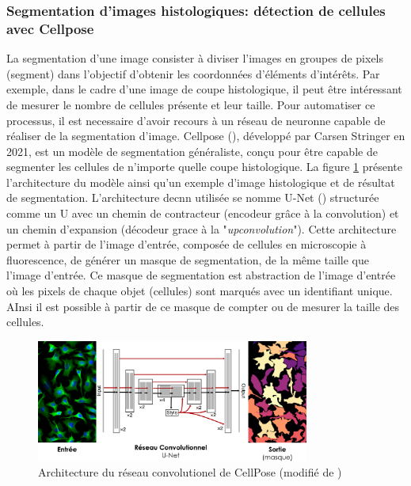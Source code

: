 \subsubsection{Segmentation d'images histologiques: détection de cellules avec Cellpose}
La segmentation d'une image consister à diviser l'images en groupes de pixels (segment) dans l'objectif d'obtenir les coordonnées d'éléments d'intérêts. Par exemple, dans le cadre d'une image de coupe histologique, il peut être intéressant de mesurer le nombre de cellules présente et leur taille. Pour automatiser ce processus, il est necessaire d'avoir recours à un réseau de neuronne capable de réaliser de la segmentation d'image.
Cellpose (\cite{stringer_cellpose_2021}), développé par Carsen Stringer en 2021, est un modèle de segmentation généraliste, conçu pour être capable de segmenter les cellules de n'importe quelle coupe histologique. La figure \ref{fig:cellpose_archi} présente l'architecture du modèle ainsi qu'un exemple d'image histologique et de résultat de segmentation. L'architecture de\gls{cnn} utilisée se nomme U-Net (\cite{ronneberger_u-net_2015}) structurée comme un U avec un chemin de contracteur (encodeur grâce à la convolution) et un chemin d'expansion (décodeur grace à la "\textit{upconvolution}"). Cette architecture permet à partir de l'image d'entrée, composée de cellules en microscopie à fluorescence, de générer un masque de segmentation, de la même taille que l'image d'entrée. Ce masque de segmentation est abstraction de l'image d'entrée où les pixels de chaque objet (cellules) sont marqués avec un identifiant unique. AInsi il est possible à partir de ce masque de compter ou de mesurer la taille des cellules.
\begin{figure}[!htbp]
 \centering
 \includegraphics[width=0.8\textwidth]{figures/cellpose_archi.png}
 \caption[Architecture du réseau convolutionel de CellPose]{Architecture du réseau convolutionel de CellPose (modifié de \cite{stringer_cellpose_2021})}
 \label{fig:cellpose_archi}
\end{figure}
